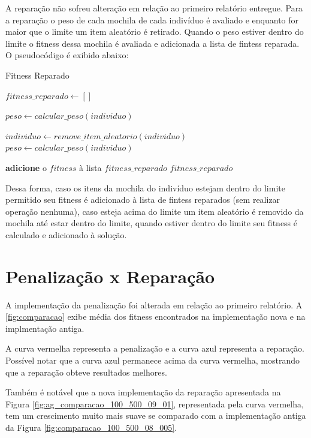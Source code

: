 \documentclass[11pt]{article}
\begin{document}
A reparação não sofreu alteração em relação ao primeiro relatório entregue. Para a reparação o peso de cada mochila de cada indivíduo é avaliado e enquanto for maior que o limite um item aleatório é retirado. Quando o peso estiver dentro do limite o fitness dessa mochila é avaliada e adicionada a lista de fintess reparada. O pseudocódigo é exibido abaixo: 


\begin{algorithm}
	\caption{Fitness Reparado}\label{euclid}
	\begin{algorithmic}[1]
		
			\State $fitness\_reparado \gets []$
			
				\State $peso \gets calcular\_peso(individuo)$
				
					\State $ individuo \gets remove\_item\_aleatorio(individuo) $
					\State $peso \gets calcular\_peso(individuo)$
				
				
				\State \textbf{adicione} o $fitness$ à lista $fitness\_reparado$
			\State \Return $fitness\_reparado$
		\EndFunction
	\end{algorithmic}
\end{algorithm}

Dessa forma, caso os itens da mochila do indivíduo estejam dentro do limite permitido seu fitness é adicionado à lista de fintess reparados (sem realizar operação nenhuma), caso esteja acima do limite um item aleatório é removido da mochila até estar dentro do limite, quando estiver dentro do limite seu fitness é calculado e adicionado à solução.

\section{Penalização x Reparação}

A implementação da penalização foi alterada em relação ao primeiro relatório. A  \ref{fig:comparacao} exibe média dos fitness encontrados na implementação nova e na implmentação antiga.

A curva vermelha representa a penalização e a curva azul representa a reparação. Possível notar que a curva azul permanece acima da curva vermelha, mostrando que a reparação obteve resultados melhores.

Também é notável que a nova implementação da reparação apresentada na Figura \ref{fig:ag_comparacao_100_500_09_01}, representada pela curva vermelha, tem um crescimento muito mais suave se comparado com a implementação antiga da Figura \ref{fig:comparacao_100_500_08_005}.
\end{document}
